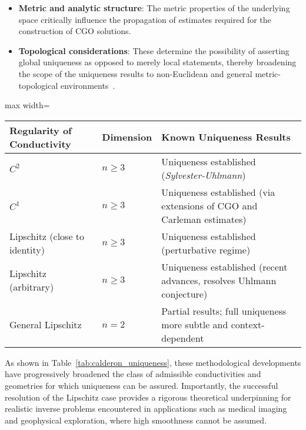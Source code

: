 \begin{itemize}
    \item \textbf{Metric and analytic structure}: The metric properties of the underlying space critically influence the propagation of estimates required for the construction of CGO solutions.
    \item \textbf{Topological considerations}: These determine the possibility of asserting global uniqueness as opposed to merely local statements, thereby broadening the scope of the uniqueness results to non-Euclidean and general metric-topological environments~\cite{ref102}.
\end{itemize}

\begin{table*}[htbp]
\centering
\caption{Summary of uniqueness results for Calderón's problem under varying conductivity regularity and spatial dimension.}
\label{tab:calderon_uniqueness}
\begin{adjustbox}{max width=\textwidth}
\begin{tabular}{lll}
\toprule
\textbf{Regularity of Conductivity} & \textbf{Dimension} & \textbf{Known Uniqueness Results} \\
\midrule
$C^2$ & $n \geq 3$ & Uniqueness established (\textit{Sylvester-Uhlmann}) \\
$C^1$ & $n \geq 3$ & Uniqueness established (via extensions of CGO and Carleman estimates) \\
Lipschitz (close to identity) & $n \geq 3$ & Uniqueness established (perturbative regime) \\
Lipschitz (arbitrary) & $n \geq 3$ & Uniqueness established (recent advances, resolves Uhlmann conjecture) \\
General Lipschitz & $n = 2$ & Partial results; full uniqueness more subtle and context-dependent \\
\bottomrule
\end{tabular}
\end{adjustbox}
\end{table*}

As shown in Table~\ref{tab:calderon_uniqueness}, these methodological developments have progressively broadened the class of admissible conductivities and geometries for which uniqueness can be assured. Importantly, the successful resolution of the Lipschitz case provides a rigorous theoretical underpinning for realistic inverse problems encountered in applications such as medical imaging and geophysical exploration, where high smoothness cannot be assumed.

